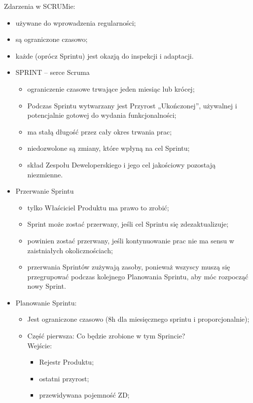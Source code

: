 \documentclass[a4paper]{article}
\begin{document}
Zdarzenia w SCRUMie:
\begin{itemize}
    \item używane do wprowadzenia regularności;
    \item są ograniczone czasowo;
    \item każde (oprócz Sprintu) jest okazją do inspekcji i adaptacji.
    \\
    \item SPRINT – serce Scruma
    \begin{itemize}
        \item ograniczenie czasowe trwające jeden miesiąc lub krócej;
        \item Podczas Sprintu wytwarzany jest Przyrost „Ukończonej”,
używalnej i potencjalnie gotowej do wydania funkcjonalności;
        \item ma stałą długość przez cały okres trwania prac;
        \item niedozwolone są zmiany, które wpłyną na cel Sprintu;
        \item skład Zespołu Deweloperskiego i jego cel jakościowy
pozostają niezmienne.
    \end{itemize}
    \item Przerwanie Sprintu
    \begin{itemize}
        \item tylko Właściciel Produktu ma prawo to zrobić;
        \item Sprint może zostać przerwany, jeśli cel Sprintu się
zdezaktualizuje;
        \item powinien zostać przerwany, jeśli kontynuowanie prac nie ma
sensu w zaistniałych okolicznościach;
        \item przerwania Sprintów zużywają zasoby, ponieważ wszyscy
muszą się przegrupować podczas kolejnego Planowania
Sprintu, aby móc rozpocząć nowy Sprint.
    \end{itemize}
    \item Planowanie Sprintu:
    \begin{itemize}
        \item Jest ograniczone czasowo (8h dla miesięcznego
sprintu i proporcjonalnie);
        \item Część pierwsza: Co będzie zrobione w tym Sprincie?\\
Wejście:
\begin{itemize}
    \item Rejestr Produktu;
    \item ostatni przyrost;
    \item przewidywana pojemność ZD;

\end{itemize}
\end{itemize}
\end{itemize}
\end{document}
